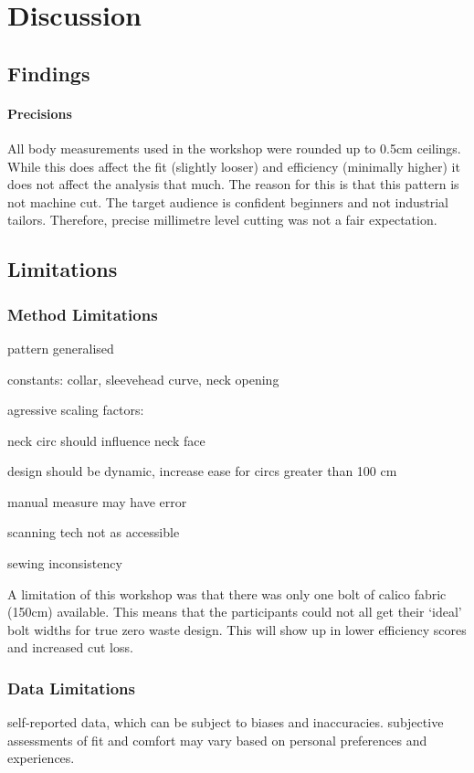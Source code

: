 \chapter{Discussion}

\section{Findings}
\subsubsection{Precisions}
All body measurements used in the workshop were rounded up to 0.5cm ceilings. While this does affect the fit (slightly looser) and efficiency (minimally higher) it does not affect the analysis that much. The reason for this is that this pattern is not machine cut. The target audience is confident beginners and not industrial tailors. Therefore, precise millimetre level cutting was not a fair expectation.

\section{Limitations}

\subsection{Method Limitations}
pattern generalised

constants: collar, sleevehead curve, neck opening

agressive scaling factors:

neck circ should influence neck face

design should be dynamic, increase ease for circs greater than 100 cm

manual measure may have error

scanning tech not as accessible

sewing inconsistency

A limitation of this workshop was that there was only one bolt of calico fabric (150cm) available. This means that the participants could not all get their ‘ideal’ bolt widths for true zero waste design. This will show up in lower efficiency scores and increased cut loss.

\subsection{Data Limitations}
self-reported data, which can be subject to biases and inaccuracies. subjective assessments of fit and comfort may vary based on personal preferences and experiences. 

